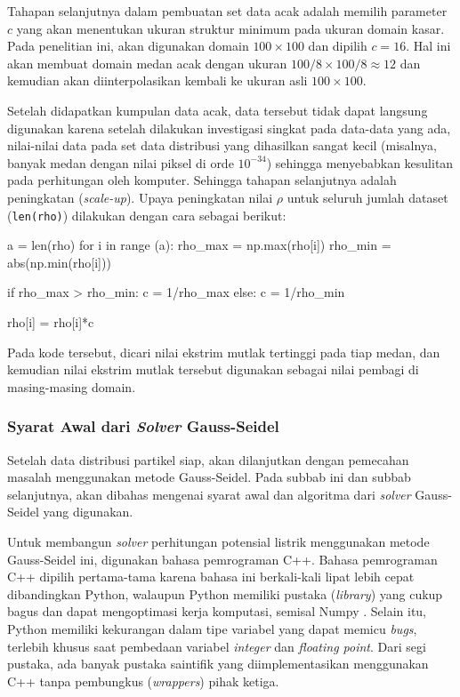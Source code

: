 Tahapan selanjutnya dalam pembuatan set data acak adalah memilih parameter $c$ yang
akan menentukan ukuran struktur minimum pada ukuran domain kasar. Pada
penelitian ini, akan digunakan domain $100 \times 100$ dan dipilih $c = 16$. Hal
ini akan membuat domain medan acak dengan ukuran $100/8 \times 100/8 \approx 12$
dan kemudian akan diinterpolasikan kembali ke ukuran asli $100 \times 100$.

Setelah didapatkan kumpulan data acak, data tersebut tidak dapat langsung digunakan
karena setelah dilakukan investigasi singkat pada data-data yang ada, nilai-nilai
data pada set data distribusi yang dihasilkan sangat kecil (misalnya, banyak
medan dengan nilai piksel di orde $10^{-34}$) sehingga menyebabkan kesulitan pada
perhitungan oleh komputer. Sehingga tahapan selanjutnya adalah peningkatan (\textit{scale-up}).
Upaya peningkatan nilai $\rho$ untuk seluruh jumlah dataset (\texttt{len(rho)}) dilakukan
dengan cara sebagai berikut:

\begin{mypythoncode}
   a = len(rho) for i in range (a): rho_max
  = np.max(rho[i]) rho_min = abs(np.min(rho[i]))

  if rho_max > rho_min: c = 1/rho_max else: c = 1/rho_min

  rho[i] = rho[i]*c
\end{mypythoncode}

Pada kode tersebut, dicari nilai ekstrim mutlak tertinggi pada tiap medan, dan
kemudian nilai ekstrim mutlak tersebut digunakan sebagai nilai pembagi di masing-masing
domain.

\subsubsection{Syarat Awal dari \textit{Solver} Gauss-Seidel}

Setelah data distribusi partikel siap, akan dilanjutkan dengan pemecahan masalah
menggunakan metode Gauss-Seidel. Pada subbab ini dan subbab selanjutnya, akan
dibahas mengenai syarat awal dan algoritma dari \textit{solver} Gauss-Seidel yang
digunakan.

Untuk membangun \textit{solver} perhitungan potensial listrik menggunakan metode
Gauss-Seidel ini, digunakan bahasa pemrograman C++. Bahasa pemrograman C++
dipilih pertama-tama karena bahasa ini berkali-kali lipat lebih cepat
dibandingkan Python, walaupun Python memiliki pustaka (\textit{library}) yang
cukup bagus dan dapat mengoptimasi kerja komputasi, semisal Numpy \citep{lubos_brieda_2019}.
Selain itu, Python memiliki kekurangan dalam tipe variabel yang dapat memicu
\textit{bugs}, terlebih khusus saat pembedaan variabel \textit{integer} dan \textit{floating
point}. Dari segi pustaka, ada banyak pustaka saintifik yang diimplementasikan
menggunakan C++ tanpa pembungkus (\textit{wrappers}) pihak ketiga.

